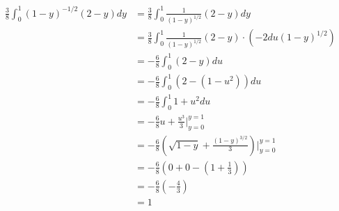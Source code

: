 \begin{align*}
	\frac{3}{8} \int_0^1 (1-y)^{-1/2} (2-y) dy &= \frac{3}{8} \int_0^1 \frac{1}{(1-y)^{1/2}} (2-y) dy \\
	&= \frac{3}{8} \int_0^1 \frac{1}{(1-y)^{1/2}} (2-y) \cdot (-2du(1-y)^{1/2}) \\
	&= -\frac{6}{8} \int_0^1 (2-y) du \\
	&= -\frac{6}{8} \int_0^1 (2-(1 - u^2)) du \\
	&= -\frac{6}{8} \int_0^1 1 + u^2 du \\
	&= -\frac{6}{8} u + \frac{u^3}{3} \bigg\rvert_{y=0}^{y=1} \\
	&= -\frac{6}{8} \left( \sqrt{1-y} + \frac{(1-y)^{3/2}}{3} \right)\bigg\rvert_{y=0}^{y=1} \\
	&= -\frac{6}{8} \left(0 + 0 - \left(1 + \frac{1}{3}\right)\right) \\
	&= -\frac{6}{8} \left(- \frac{4}{3}\right) \\
	&= 1
\end{align*}
